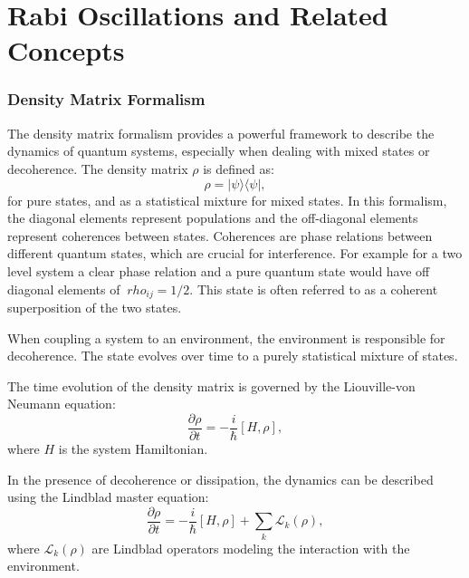 
\chapter{Rabi Oscillations and Related Concepts} %

\label{ChapterRabiOscillations} %


\subsection{Density Matrix Formalism}

The density matrix formalism provides a powerful framework to describe the dynamics of quantum systems, especially when dealing with mixed states or decoherence.
The density matrix \(\rho\) is defined as:
\begin{equation}
	\rho = |\psi\rangle \langle \psi|,
	\label{eq:DensityMatrix}
\end{equation}
for pure states, and as a statistical mixture for mixed states.
In this formalism, the diagonal elements represent populations and the off-diagonal elements represent coherences between states.
Coherences are phase relations between different quantum states, which are crucial for interference.
For example for a two level system a clear phase relation and a pure quantum state would have off diagonal elements of $ \ rho_{ij} = 1/2$.
This state is often referred to as a coherent superposition of the two states.

When coupling a system to an environment, the environment is responsible for decoherence.
The state evolves over time to a purely statistical mixture of states.


The time evolution of the density matrix is governed by the Liouville-von Neumann equation:
\begin{equation}
	\frac{\partial \rho}{\partial t} = -\frac{i}{\hbar} [H, \rho],
	\label{eq:Liouville}
\end{equation}
where \(H\) is the system Hamiltonian.

In the presence of decoherence or dissipation, the dynamics can be described using the Lindblad master equation:
\begin{equation}
	\frac{\partial \rho}{\partial t} = -\frac{i}{\hbar} [H, \rho] + \sum_k \mathcal{L}_k(\rho),
	\label{eq:Lindblad}
\end{equation}
where \(\mathcal{L}_k(\rho)\) are Lindblad operators modeling the interaction with the environment.


